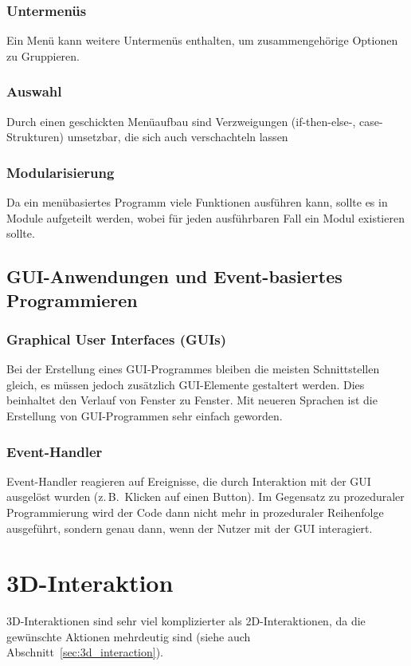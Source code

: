 \documentclass[a4paper, 11pt, accentcolor = tud3b]{tudreport}
\newcommand{\zB}{z.\,B.~}
\begin{document}
				\subsubsection{Untermenüs}
					Ein Menü kann weitere Untermenüs enthalten, um zusammengehörige Optionen zu Gruppieren.
				
				\subsubsection{Auswahl}
					Durch einen geschickten Menüaufbau sind Verzweigungen (if-then-else-, case-Strukturen) umsetzbar, die sich auch verschachteln lassen

				\subsubsection{Modularisierung}
					Da ein menübasiertes Programm viele Funktionen ausführen kann, sollte es in Module aufgeteilt werden, wobei für jeden ausführbaren Fall ein Modul existieren sollte.

			\subsection{GUI-Anwendungen und Event-basiertes Programmieren}
				\subsubsection{Graphical User Interfaces (GUIs)}
					Bei der Erstellung eines GUI-Programmes bleiben die meisten Schnittstellen gleich, es müssen jedoch zusätzlich GUI-Elemente gestaltert werden. Dies beinhaltet den Verlauf von Fenster zu Fenster. Mit neueren Sprachen ist die Erstellung von GUI-Programmen sehr einfach geworden.

				\subsubsection{Event-Handler}
					Event-Handler reagieren auf Ereignisse, die durch Interaktion mit der GUI ausgelöst wurden (\zB Klicken auf einen Button). Im Gegensatz zu prozeduraler Programmierung wird der Code dann nicht mehr in prozeduraler Reihenfolge ausgeführt, sondern genau dann, wenn der Nutzer mit der GUI interagiert.

		\section{3D-Interaktion}
			3D-Interaktionen sind sehr viel komplizierter als 2D-Interaktionen, da die gewünschte Aktionen mehrdeutig sind (siehe auch Abschnitt~\ref{sec:3d_interaction}).
\end{document}
